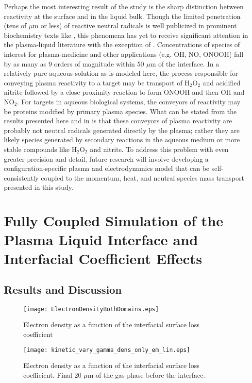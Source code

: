 Perhaps the most interesting result of the study is the sharp distinction between reactivity at the surface and in the liquid bulk. Though the limited penetration (tens of $\mu$m or less) of reactive neutral radicals is well publicized in prominent biochemistry texts like \cite{Halliwell}, this phenomena has yet to receive significant attention in the plasma-liquid literature with the exception of \cite{Chen2014a}. Concentrations of species of interest for plasma-medicine and other applications (e.g. OH, NO, ONOOH) fall by as many as 9 orders of magnitude within 50 $\mu$m of the interface. In a relatively pure aqueous solution as is modeled here, the process responsible for conveying plasma reactivity to a target may be transport of H$_2$O$_2$ and acidified nitrite followed by a close-proximity reaction to form ONOOH and then OH and NO$_2$. For targets in aqueous biological systems, the conveyors of reactivity may be proteins modified by primary plasma species. What can be stated from the results presented here and in \cite{Chen2014a} is that these conveyors of plasma reactivity are probably not neutral radicals generated directly by the plasma; rather they are likely species generated by secondary reactions in the aqueous medium or more stable compounds like H$_2$O$_2$ and nitrite. To address this problem with even greater precision and detail, future research will involve developing a configuration-specific plasma and electrodynamics model that can be self-consistently coupled to the momentum, heat, and neutral species mass transport presented in this study.

\section{Fully Coupled Simulation of the Plasma Liquid Interface and Interfacial Coefficient Effects}
\label{sec:plasliq}

\subsection{Results and Discussion}
\label{sec:plasliq_results}

\begin{figure}[htpb]
  \centering
  \texttt{[image: ElectronDensityBothDomains.eps]}
  \caption{Electron density as a function of the interfacial surface loss coefficient}
  \label{fig:electrons}
\end{figure}

\begin{figure}[htpb]
  \centering
  \texttt{[image: kinetic\_vary\_gamma\_dens\_only\_em\_lin.eps]}
  \caption{Electron density as a function of the interfacial surface loss coefficient. Final 20 $\mu$m of the gas phase before the interface.}
  \label{fig:electrons_int}
\end{figure}

